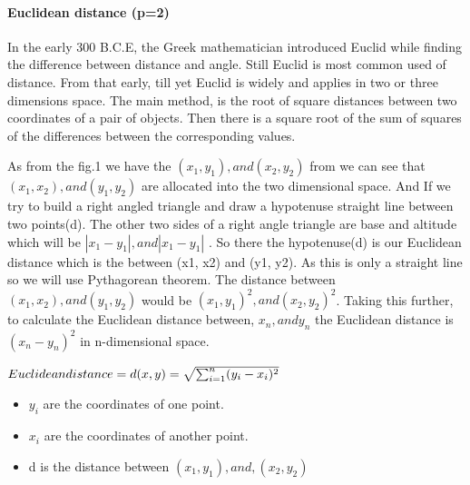 \documentclass[conference]{IEEEtran}
\begin{document}
\paragraph{\textbf{Euclidean distance (p=2)}}
In the early 300 B.C.E, the Greek mathematician introduced Euclid while finding the difference between distance and angle. Still Euclid is most common used of distance. From that early, till yet Euclid is widely and applies in two or three dimensions space. The main method, is the root of square distances between two coordinates of a pair of objects. Then there is a square root of the sum of squares of the differences between the corresponding values. 

As from the fig.1 we have the 
\begin{math}
(x_1,y_1), and (x_2,y_2)
\end{math}
from we can see that 
\begin{math}
(x_1,x_2), and (y_1,y_2)
\end{math}
are allocated into the two dimensional space. And If we try to build a right angled triangle and draw a hypotenuse straight line between two points(d). The other two sides of a right angle triangle are base and altitude which will be
\begin{math}
|x_1 - y_1|, and |x_1 - y_1|
\end{math}
. So there the hypotenuse(d) is our Euclidean distance which is the between (x1, x2) and (y1, y2). As this is only a straight line so we will use Pythagorean theorem. The distance between 
\begin{math}
(x_1,x_2), and (y_1,y_2)
\end{math}
would be \begin{math}
(x_1,y_1)^2, and (x_2,y_2)^2
\end{math}.
Taking this further, to calculate the Euclidean distance between,
\begin{math}
x_n,  and y_n 
\end{math}
the Euclidean distance is
\begin{math}
(x_n - y_n)^2
\end{math} in n-dimensional space. 




\begin{math}
Euclidean distance = d(x,y)=\sqrt{\sum_{i=1}^{n} (y_{i} - x_{i})^2}
\newline
\end{math}

\begin{itemize}
    \item \begin{math}
y_{i}
\end{math}
are the coordinates of one point.
\item \begin{math}
x_{i}
\end{math}
are the coordinates of another point.

\item 
d is the distance between
\begin{math}
(x_{1},y_{1}), and, (x_{2},y_{2})
\end{math}

\end{itemize}
\end{document}
